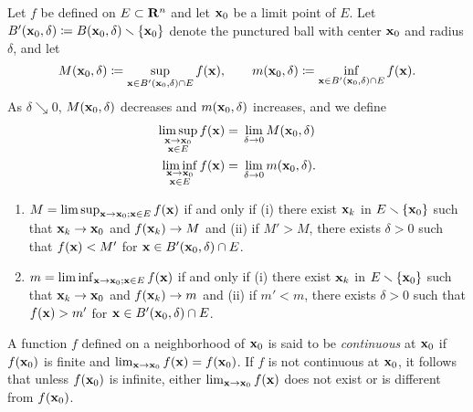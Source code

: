 Let $f$ be defined on $E\subset\mathbf{R}^n$ and let $\mathbf{x}_0$ be a limit point of
$E$. Let $B'(\mathbf{x}_0,\delta)\coloneqq B(\mathbf{x}_0,\delta)\smallsetminus\{\mathbf{x}_0\}$
denote the punctured ball with center $\mathbf{x}_0$ and radius $\delta$, and let
\begin{equation}
\label{eq:sup-inf-ball}
M(\mathbf{x}_0,\delta)\coloneqq\sup_{\mathbf{x}\in B'(\mathbf{x}_0,\delta)\cap E}
f(\mathbf{x}),\qquad
m(\mathbf{x}_0,\delta)\coloneqq\inf_{\mathbf{x}\in B'(\mathbf{x}_0,\delta)\cap E}
f(\mathbf{x}).
\end{equation}
As $\delta\searrow 0$, $M(\mathbf{x}_0,\delta)$ decreases and $m(\mathbf{x}_0,\delta)$
increases, and we define
\begin{equation}
  \label{eq:ball-limsup-liminf}
\begin{aligned}
\limsup_{\substack{\mathbf{x}\to\mathbf{x}_0\\\mathbf{x}\in E}} f(\mathbf{x})
={}&\lim_{\delta\to 0}M(\mathbf{x}_0,\delta)\\
\liminf_{\substack{\mathbf{x}\to\mathbf{x}_0\\\mathbf{x}\in E}} f(\mathbf{x})
={}&\lim_{\delta\to 0}m(\mathbf{x}_0,\delta).
\end{aligned}
\end{equation}
\begin{theorem}[1.14]
\begin{enumerate}[label=\textnormal{(\alph*)}]
\item $M=\limsup_{\mathbf{x}\to\mathbf{x}_0;\mathbf{x}\in E} f(\mathbf{x})$ if and only if
  \textnormal{(i)} there exist ${\mathbf{x}_k}$ in $E\smallsetminus\{\mathbf{x}_0\}$ such that
  $\mathbf{x}_k\to\mathbf{x}_0$ and $f(\mathbf{x}_k)\to M$ and \textnormal{(ii)} if $M'>M$,
  there exists $\delta>0$ such that $f(\mathbf{x})<M'$ for $\mathbf{x}\in
  B'(\mathbf{x}_0,\delta)\cap E$.
\item $m=\liminf_{\mathbf{x}\to\mathbf{x}_0;\mathbf{x}\in E} f(\mathbf{x})$ if and only if
  \textnormal{(i)} there exist ${\mathbf{x}_k}$ in $E\smallsetminus\{\mathbf{x}_0\}$ such that
  $\mathbf{x}_k\to\mathbf{x}_0$ and $f(\mathbf{x}_k)\to m$ and \textnormal{(ii)} if $m'<m$,
  there exists $\delta>0$ such that $f(\mathbf{x})>m'$ for $\mathbf{x}\in
  B'(\mathbf{x}_0,\delta)\cap E$.
\end{enumerate}
\end{theorem}

A function $f$ defined on a neighborhood of $\mathbf{x}_0$ is said to be
\emph{continuous} at $\mathbf{x}_0$ if $f(\mathbf{x}_0)$ is finite and
$\lim_{\mathbf{x}\to\mathbf{x}_0}f(\mathbf{x})=f(\mathbf{x}_0)$. If $f$ is not continuous at
$\mathbf{x}_0$, it follows that unless $f(\mathbf{x}_0)$ is infinite, either
$\lim_{\mathbf{x}\to\mathbf{x}_0} f(\mathbf{x})$ does not exist or is different from
$f(\mathbf{x}_0)$.

